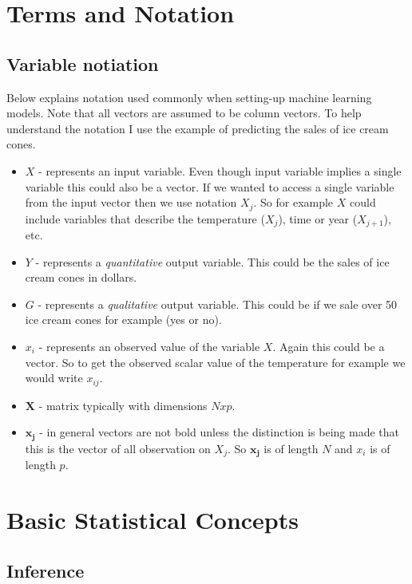 \documentclass[paper=a4, fontsize=11pt]{scrartcl} %
\numberwithin{equation}{section} %
\numberwithin{figure}{section} %
\numberwithin{table}{section} %
\begin{document}
\section{Terms and Notation}

\subsection{Variable notiation}
\label{sec:notation}

Below explains notation used commonly when setting-up machine learning models. Note that all vectors are assumed to be column vectors. To help understand the notation I use the example of predicting the sales of ice cream cones. 
\vspace{2mm}

\begin{itemize}
\item $X$ - represents an input variable. Even though input variable implies a single variable this could also be a vector. If we wanted to access a single variable from the input vector then we use notation $X_j$. So for example $X$ could include variables that describe the temperature ($X_{j}$), time or year ($X_{j+1}$), etc. 
\item $Y$ - represents a \emph{quantitative} output variable. This could be the sales of ice cream cones in dollars.
\item $G$ - represents a \emph{qualitative} output variable. This could be if we sale over 50 ice cream cones for example (yes or no). 
\item $x_i$ - represents an observed value of the variable $X$. Again this could be a vector. So to get the observed scalar value of the temperature for example we would write $x_{ij}$. 
\item $\bm{X}$ - matrix typically with dimensions $Nxp$. 
\item $\bm{x_j}$ -  in general vectors are not bold unless the distinction is being made that this is the vector of all observation on $X_j$. So $\bm{x_j}$ is of length $N$ and $x_i$ is of length $p$.
\end{itemize}


\section{Basic Statistical Concepts}

\subsection{Inference}
\end{document}

